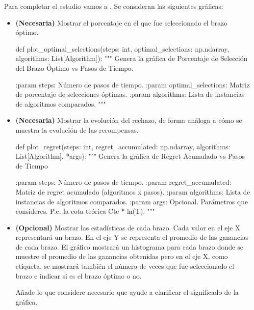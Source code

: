 \documentclass[a4paper, 11pt]{article}
\begin{document}
Para completar el estudio vamos a . Se consideran  las siguientes gráficas:

\begin{itemize}
\item \textbf{(Necesaria)} Mostrar el porcentaje en el que fue seleccionado el brazo óptimo.


\begin{pyverbatim}[][fontsize=\scriptsize]
def plot_optimal_selections(steps: int, 
							optimal_selections: np.ndarray, 
							algorithms: List[Algorithm]):
    """
    Genera la gráfica de Porcentaje de Selección del Brazo Óptimo vs Pasos de Tiempo.

    :param steps: Número de pasos de tiempo.
    :param optimal_selections: Matriz de porcentaje de selecciones óptimas.
    :param algorithms: Lista de instancias de algoritmos comparados.
    """
\end{pyverbatim}




\item \textbf{(Necesaria)} Mostrar la evolución del rechazo, de forma análoga a cómo se muestra la evolución de las recompensas.


\begin{pyverbatim}[][fontsize=\scriptsize]
def plot_regret(steps: int, 
				regret_accumulated: np.ndarray, 
				algorithms: List[Algorithm], *args):
    """
    Genera la gráfica de Regret Acumulado vs Pasos de Tiempo 

    :param steps: Número de pasos de tiempo.
    :param regret_accumulated: Matriz de regret acumulado (algoritmos x pasos).
    :param algorithms: Lista de instancias de algoritmos comparados.
    :param args: Opcional. Parámetros que consideres. P.e. la cota teórica Cte * ln(T).
    """
\end{pyverbatim}



\item \textbf{(Opcional)} Mostrar las estadísticas de cada brazo. Cada valor en el eje X  representará un brazo. En el eje Y se representa el promedio de las ganancias de cada brazo. El gráfico  mostrará un histograma para cada brazo donde se muestre el promedio de las ganancias obtenidas pero en el eje X, como etiqueta, se mostrará también el número de veces que fue seleccionado el brazo e indicar si es el brazo óptimo o no.

Añade lo que considere necesario que ayude a clarificar el significado de la gráfica.




\end{itemize}
\end{document}
